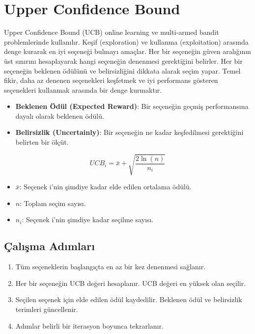 \section{Upper Confidence Bound}

Upper Confidence Bound (UCB) online learning ve multi-armed bandit problemlerinde kullanılır. Keşif (exploration) ve kullanma (exploitation) arasında denge kurarak en iyi seçeneği bulmayı amaçlar. Her bir seçeneğin güven aralığının üst sınırını hesaplayarak hangi seçeneğin denenmesi gerektiğini belirler. Her bir seçeneğin beklenen ödülünü ve belirsizliğini dikkata alarak seçim yapar. Temel fikir, daha az denenen seçenekleri keşfetmek ve iyi performans gösteren seçenekleri kullanmak arasında bir denge kurmaktır.

\begin{itemize}
	\item \textbf{Beklenen Ödül (Expected Reward)}: Bir seçeneğin  geçmiş performansına dayalı olarak beklenen ödülü.
	\item \textbf{Belirsizlik (Uncertainly)}: Bir seçeneğin ne kadar keşfedilmesi gerektiğini belirten bir ölçüt.
\end{itemize}

\[ UCB_i = \bar{x} + \sqrt{\frac{2\ln(n)}{n_i}} \]

\begin{itemize}
	\item $\bar{x}$: Seçenek i'nin şimdiye kadar elde edilen ortalama ödülü.
	\item $n$: Toplam seçim sayısı.
	\item $n_i$: Seçenek i'nin şimdiye kadar seçilme sayısı.
\end{itemize}

\subsection{Çalışma Adımları}

\begin{enumerate}
	\item Tüm seçeneklerin başlangıçta en az bir kez denenmesi sağlanır.
	\item Her bir seçeneğin UCB değeri hesaplanır. UCB değeri en yüksek olan seçilir.
	\item Seçilen seçenek için elde edilen ödül kaydedilir. Beklenen ödül ve belirsizlik terimleri güncellenir.
	\item Adımlar belirli bir iterasyon boyunca tekrarlanır.
\end{enumerate}


\newpage